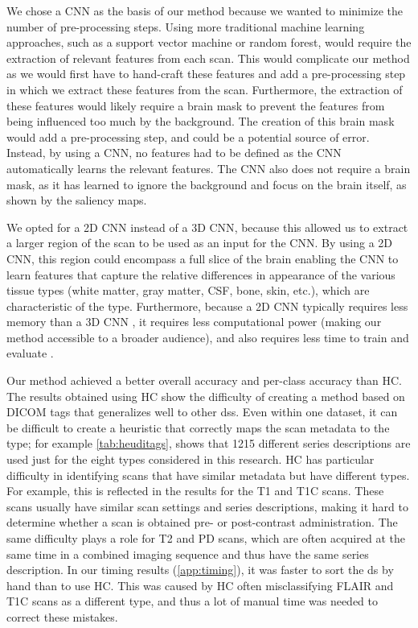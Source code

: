 We chose a \gls{CNN} as the basis of our method because we wanted to minimize the number of pre-processing steps.
Using more traditional machine learning approaches, such as a support vector machine or random forest, would require the extraction of relevant features from each \gls{scan}.
This would complicate our method as we would first have to hand-craft these features and add a pre-processing step in which we extract these features from the \gls{scan}.
Furthermore, the extraction of these features would likely require a brain mask to prevent the features from being influenced too much by the background.
The creation of this brain mask would add a pre-processing step, and could be a potential source of error.
Instead, by using a \gls{CNN}, no features had to be defined as the \gls{CNN} automatically learns the relevant features.
The \gls{CNN} also does not require a brain mask, as it has learned to ignore the background and focus on the brain itself, as shown by the saliency maps.

We opted for a 2D \gls{CNN} instead of a 3D \gls{CNN}, because this allowed us to extract a larger region of the \gls{scan} to be used as an input for the \gls{CNN}.
By using a 2D \gls{CNN}, this region could encompass a full slice of the brain enabling the \gls{CNN} to learn features that capture the relative differences in appearance of the various tissue types (white matter, gray matter, \acrshort{CSF}, bone, skin, etc.), which are characteristic of the \gls{type}.
Furthermore, because a 2D \gls{CNN} typically requires less memory than a 3D \gls{CNN} \autocite{prasoon2013deep}, it requires less computational power (making our method accessible to a broader audience), and also requires less time to train and evaluate \autocite{rongjian2014deep}.

Our method achieved a better overall accuracy and per-class accuracy than \gls{HC}.
The results obtained using \gls{HC} show the difficulty of creating a method based on \gls{DICOM} tags that generalizes well to other \glspl{ds}.
Even within one dataset, it can be difficult to create a heuristic that correctly maps the \gls{scan} metadata to the \gls{type}; for example \cref{tab:heuditags}, shows that 1215 different series descriptions are used just for the eight \glspl{type} considered in this research.
\gls{HC} has particular difficulty in identifying \glspl{scan} that have similar metadata but have different \glspl{type}.
For example, this is reflected in the results for the \gls{T1} and \gls{T1C} \glspl{scan}.
These \glspl{scan} usually have similar scan settings and series descriptions, making it hard to determine whether a \gls{scan} is obtained pre- or post-contrast administration.
The same difficulty plays a role for \gls{T2} and \gls{PD} \glspl{scan}, which are often acquired at the same time in a combined imaging sequence and thus have the same series description.
In our timing results (\cref{app:timing}), it was faster to sort the \gls{ds} by hand than to use \gls{HC}.
This was caused by \gls{HC} often misclassifying \gls{FLAIR} and \gls{T1C} \glspl{scan} as a different \gls{type}, and thus a lot of manual time was needed to correct these mistakes.

